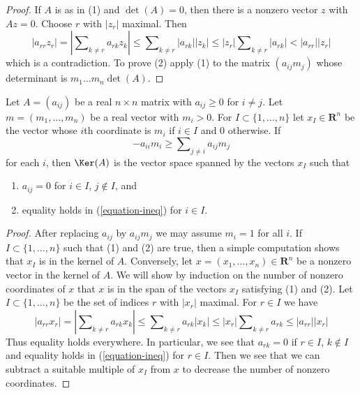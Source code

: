 \begin{proof}
If $A$ is as in (1) and $\det(A) = 0$, then there is a nonzero vector
$z$ with $Az = 0$. Choose $r$ with $|z_r|$ maximal. Then
$$
|a_{rr} z_r| = |\sum\nolimits_{k \not = r} a_{rk}z_k| \leq
\sum\nolimits_{k \not = r} |a_{rk}||z_k| \leq
|z_r| \sum\nolimits_{k \not = r} |a_{rk}| < |a_{rr}||z_r|
$$
which is a contradiction. To prove (2) apply (1) to the matrix
$(a_{ij}m_j)$ whose determinant is $m_1 \ldots m_n \det(A)$.
\end{proof}

\begin{lemma}
\label{lemma-recurring-real}
Let $A = (a_{ij})$ be a real $n \times n$ matrix with
$a_{ij} \geq 0$ for $i \not = j$. Let $m = (m_1, \ldots, m_n)$ be a real
vector with $m_i > 0$. For $I \subset \{1, \ldots, n\}$ let
$x_I \in \mathbf{R}^n$
be the vector whose $i$th coordinate is $m_i$ if $i \in I$
and $0$ otherwise. If
\begin{equation}
\label{equation-ineq}
-a_{ii}m_i \geq \sum\nolimits_{j \not = i} a_{ij}m_j
\end{equation}
for each $i$, then $\Ker(A)$ is the vector space
spanned by the vectors $x_I$ such that
\begin{enumerate}
\item $a_{ij} = 0$ for $i \in I$, $j \not \in I$, and
\item equality holds in (\ref{equation-ineq}) for $i \in I$.
\end{enumerate}
\end{lemma}

\begin{proof}
After replacing $a_{ij}$ by $a_{ij}m_j$ we may assume $m_i = 1$ for all $i$.
If $I \subset \{1, \ldots, n\}$ such that (1) and (2) are true,
then a simple computation shows that $x_I$ is in the kernel of $A$.
Conversely, let $x = (x_1, \ldots, x_n) \in \mathbf{R}^n$ be a
nonzero vector in the kernel of $A$. We will show by induction
on the number of nonzero coordinates of $x$ that $x$ is in the
span of the vectors $x_I$ satisfying (1) and (2). Let
$I \subset \{1, \ldots, n\}$ be the set of indices $r$ with $|x_r|$ maximal.
For $r \in I$ we have
$$
|a_{rr} x_r| = |\sum\nolimits_{k \not = r} a_{rk}x_k| \leq
\sum\nolimits_{k \not = r} a_{rk}|x_k| \leq
|x_r| \sum\nolimits_{k \not = r} a_{rk} \leq |a_{rr}||x_r|
$$
Thus equality holds everywhere. In particular, we see that
$a_{rk} = 0$ if $r \in I$, $k \not \in I$ and equality holds
in (\ref{equation-ineq}) for $r \in I$. Then we see that we
can subtract a suitable multiple of $x_I$ from $x$ to decrease
the number of nonzero coordinates.
\end{proof}

